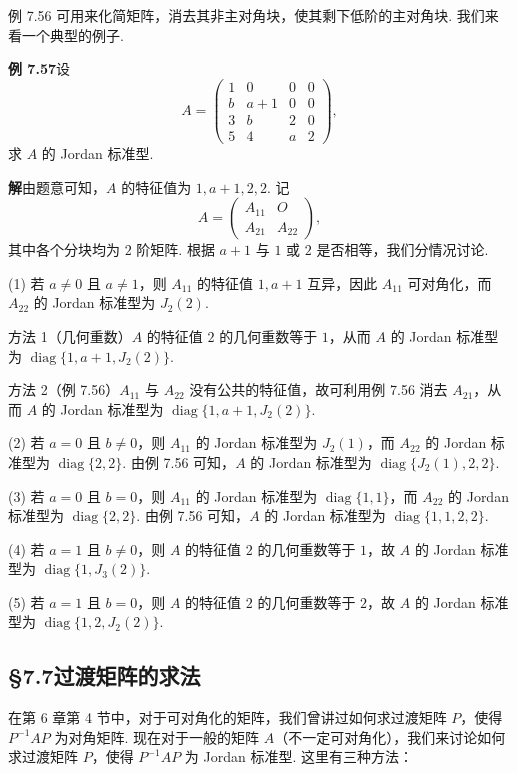 \documentclass[UTF8,12pt,a4paper,fontset=fandol]{ctexart}
\begin{document}
例 7.56 可用来化简矩阵，消去其非主对角块，使其剩下低阶的主对角块. 我们来看一个典型的例子.

\noindent\textbf{例 7.57}\quad 设
\[
A=\left(\begin{array}{cccc}
1&0&0&0\\
b&a+1&0&0\\
3&b&2&0\\
5&4&a&2
\end{array}\right),
\]
求 $A$ 的 Jordan 标准型.

\noindent\textbf{解}\quad 由题意可知，$A$ 的特征值为 $1,a+1,2,2$. 记
\[
A=\left(\begin{array}{cc}A_{11}&O\\A_{21}&A_{22}\end{array}\right),
\]
其中各个分块均为 $2$ 阶矩阵. 根据 $a+1$ 与 $1$ 或 $2$ 是否相等，我们分情况讨论.

(1) 若 $a\ne0$ 且 $a\ne1$，则 $A_{11}$ 的特征值 $1,a+1$ 互异，因此 $A_{11}$ 可对角化，而 $A_{22}$ 的 Jordan 标准型为 $J_2(2)$.

方法 1（几何重数）\quad $A$ 的特征值 $2$ 的几何重数等于 $1$，从而 $A$ 的 Jordan 标准型为 $\operatorname{diag}\{1,a+1,J_2(2)\}$.

方法 2（例 7.56）\quad $A_{11}$ 与 $A_{22}$ 没有公共的特征值，故可利用例 7.56 消去 $A_{21}$，从而 $A$ 的 Jordan 标准型为 $\operatorname{diag}\{1,a+1,J_2(2)\}$.

(2) 若 $a=0$ 且 $b\ne0$，则 $A_{11}$ 的 Jordan 标准型为 $J_2(1)$，而 $A_{22}$ 的 Jordan 标准型为 $\operatorname{diag}\{2,2\}$. 由例 7.56 可知，$A$ 的 Jordan 标准型为 $\operatorname{diag}\{J_2(1),2,2\}$.

(3) 若 $a=0$ 且 $b=0$，则 $A_{11}$ 的 Jordan 标准型为 $\operatorname{diag}\{1,1\}$，而 $A_{22}$ 的 Jordan 标准型为 $\operatorname{diag}\{2,2\}$. 由例 7.56 可知，$A$ 的 Jordan 标准型为 $\operatorname{diag}\{1,1,2,2\}$.

(4) 若 $a=1$ 且 $b\ne0$，则 $A$ 的特征值 $2$ 的几何重数等于 $1$，故 $A$ 的 Jordan 标准型为 $\operatorname{diag}\{1,J_3(2)\}$.

(5) 若 $a=1$ 且 $b=0$，则 $A$ 的特征值 $2$ 的几何重数等于 $2$，故 $A$ 的 Jordan 标准型为 $\operatorname{diag}\{1,2,J_2(2)\}$.

\subsection*{§7.7\quad 过渡矩阵的求法}

在第 6 章第 4 节中，对于可对角化的矩阵，我们曾讲过如何求过渡矩阵 $P$，使得 $P^{-1}AP$ 为对角矩阵. 现在对于一般的矩阵 $A$（不一定可对角化），我们来讨论如何求过渡矩阵 $P$，使得 $P^{-1}AP$ 为 Jordan 标准型. 这里有三种方法：
\end{document}
